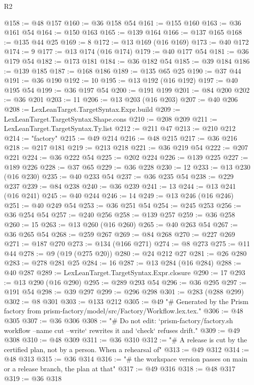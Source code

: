 \begin{lexlean}{R2}
\begin{coremodule}
@158 := @48 @157
@160 := @36 @158 @54
@161 := @155 @160
@163 := @36 @161 @54
@164 := @150 @163
@165 := @139 @164
@166 := @137 @165
@168 := @135 @44 @25
@169 := 8
@172 := @13 @169 (@16 @169)
@173 := @40 @172
@174 := 9
@177 := @13 @174 (@16 @174)
@179 := @40 @177 @54
@181 := @36 @179 @54
@182 := @173 @181
@184 := @36 @182 @54
@185 := @39 @184
@186 := @139 @185
@187 := @168 @186
@189 := @135 @65 @25
@190 := @37 @44
@191 := @36 @190
@192 := 10
@195 := @13 @192 (@16 @192)
@197 := @40 @195 @54
@199 := @36 @197 @54
@200 := @191 @199
@201 := @84 @200
@202 := @36 @201
@203 := 11
@206 := @13 @203 (@16 @203)
@207 := @40 @206
@208 := LexLeanTarget.TargetSyntax.Expr.build
@209 := LexLeanTarget.TargetSyntax.Shape.cons
@210 := @208 @209
@211 := LexLeanTarget.TargetSyntax.Ty.list
@212 := @211 @47
@213 := @210 @212
@214 := "factory"
@215 := @49 @214
@216 := @48 @215
@217 := @36 @216
@218 := @217 @181
@219 := @213 @218
@221 := @36 @219 @54
@222 := @207 @221
@224 := @36 @222 @54
@225 := @202 @224
@226 := @139 @225
@227 := @189 @226
@228 := @37 @65
@229 := @36 @228
@230 := 12
@233 := @13 @230 (@16 @230)
@235 := @40 @233 @54
@237 := @36 @235 @54
@238 := @229 @237
@239 := @84 @238
@240 := @36 @239
@241 := 13
@244 := @13 @241 (@16 @241)
@245 := @40 @244
@246 := 14
@249 := @13 @246 (@16 @246)
@251 := @40 @249 @54
@253 := @36 @251 @54
@254 := @245 @253
@256 := @36 @254 @54
@257 := @240 @256
@258 := @139 @257
@259 := @36 @258
@260 := 15
@263 := @13 @260 (@16 @260)
@265 := @40 @263 @54
@267 := @36 @265 @54
@268 := @259 @267
@269 := @84 @268
@270 := @227 @269
@271 := @187 @270
@273 := @134 (@166 @271)
@274 := @8 @273
@275 := @11 @44
@278 := @9 (@19 (@275 @20))
@280 := @24 @212 @27
@281 := @26 @280
@283 := @278 @281 @25
@284 := 16
@287 := @13 @284 (@16 @284)
@288 := @40 @287
@289 := LexLeanTarget.TargetSyntax.Expr.closure
@290 := 17
@293 := @13 @290 (@16 @290)
@295 := @289 @293 @54
@296 := @36 @295
@297 := @191 @54
@298 := @39 @297
@299 := @296 @298
@301 := @283 (@288 @299)
@302 := @8 @301
@303 := @133 @212
@305 := @49
    "# Generated by the Prism factory from prism-factory/model/src/Factory/Workflow.lex.tex."
@306 := @48 @305
@307 := @36 @306
@308 := "# Do not edit: `prism-factory/factory.sh workflow --name cut --write` rewrites it and `check` refuses drift."
@309 := @49 @308
@310 := @48 @309
@311 := @36 @310
@312 := "# A release is cut by the certified plan, not by a person. When a rehearsal of"
@313 := @49 @312
@314 := @48 @313
@315 := @36 @314
@316 := "# the workspace version passes on main or a release branch, the plan at that"
@317 := @49 @316
@318 := @48 @317
@319 := @36 @318

\end{coremodule}
\end{lexlean}
